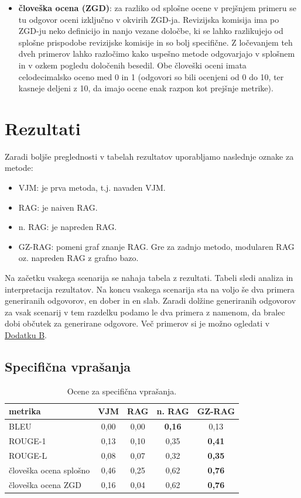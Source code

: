 \documentclass[a4paper,12pt,openright]{book}
\begin{document}
\begin{itemize}
    \item \textbf{človeška ocena (ZGD)}: za razliko od splošne ocene v prejšnjem primeru se tu odgovor oceni izključno v okvirih ZGD-ja. Revizijska komisija ima po ZGD-ju neko definicijo in nanjo vezane določbe, ki se lahko razlikujejo od splošne prispodobe revizijske komisije in so bolj specifične. Z ločevanjem teh dveh primerov lahko razločimo kako uspešno metode odgovarjajo v splošnem in v ozkem pogledu določenih besedil. Obe človeški oceni imata celodecimalsko oceno med 0 in 1 (odgovori so bili ocenjeni od 0 do 10, ter kasneje deljeni z 10, da imajo ocene enak razpon kot prejšnje metrike).
\end{itemize}

\section{Rezultati}

Zaradi boljše preglednosti v tabelah rezultatov uporabljamo naslednje oznake za metode:

\begin{itemize}
    \item VJM: je prva metoda, t.j. navaden VJM.
    \item RAG: je naiven RAG.
    \item n. RAG: je napreden RAG.
    \item GZ-RAG: pomeni graf znanje RAG. Gre za zadnjo metodo, modularen RAG oz. napreden RAG z grafno bazo.
\end{itemize}

Na začetku vsakega scenarija se nahaja tabela z rezultati. Tabeli sledi analiza in interpretacija rezultatov. Na koncu vsakega scenarija sta na voljo še dva primera generiranih odgovorov, en dober in en slab. Zaradi dolžine generiranih odgovorov za vsak scenarij v tem razdelku podamo le dva primera z namenom, da bralec dobi občutek za generirane odgovore. Več primerov si je možno ogledati v \hyperref[appendix_b]{Dodatku B}.

\subsection{Specifična vprašanja}

\begin{table}[H]
\centering
\caption{Ocene za specifična vprašanja.}
\begin{tabular}{|l|c|c|c|c|}
\hline
metrika  & VJM & RAG & n. RAG & GZ-RAG \\ \hline
BLEU           & 0,00   & 0,00     & \textbf{0,16}     & 0,13     \\ \hline
ROUGE-1        & 0,13     & 0,10     & 0,35     & \textbf{0,41}     \\ \hline
ROUGE-L        & 0,08     & 0,07     & 0,32     & \textbf{0,35}     \\ \hline
človeška ocena splošno & 0,46     & 0,25     & 0,62     & \textbf{0,76}     \\ \hline
človeška ocena ZGD & 0,16     & 0,04     & 0,62     & \textbf{0,76}     \\ \hline
\end{tabular}
\end{table}
\end{document}
